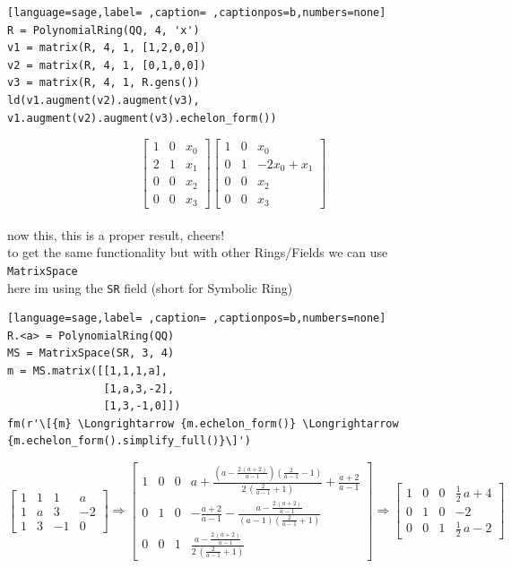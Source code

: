 \documentclass[a4paper,12pt]{article}
\begin{document}
\begin{lstlisting}[language=sage,label= ,caption= ,captionpos=b,numbers=none]
R = PolynomialRing(QQ, 4, 'x')
v1 = matrix(R, 4, 1, [1,2,0,0])
v2 = matrix(R, 4, 1, [0,1,0,0])
v3 = matrix(R, 4, 1, R.gens())
ld(v1.augment(v2).augment(v3), v1.augment(v2).augment(v3).echelon_form())
\end{lstlisting}

\[\left[\begin{array}{rrr} 1 & 0 & x_{0} \\ 2 & 1 & x_{1} \\ 0 & 0 & x_{2} \\ 0 & 0 & x_{3} \end{array}\right] \left[\begin{array}{rrr} 1 & 0 & x_{0} \\ 0 & 1 & -2 x_{0} + x_{1} \\ 0 & 0 & x_{2} \\ 0 & 0 & x_{3} \end{array}\right]\]\\[0pt]

now this, this is a proper result, cheers!\\[0pt]
to get the same functionality but with other Rings/Fields we can use \texttt{MatrixSpace}\\[0pt]
here im using the \texttt{SR} field (short for Symbolic Ring)\\[0pt]

\begin{lstlisting}[language=sage,label= ,caption= ,captionpos=b,numbers=none]
R.<a> = PolynomialRing(QQ)
MS = MatrixSpace(SR, 3, 4)
m = MS.matrix([[1,1,1,a],
               [1,a,3,-2],
               [1,3,-1,0]])
fm(r'\[{m} \Longrightarrow {m.echelon_form()} \Longrightarrow {m.echelon_form().simplify_full()}\]')
\end{lstlisting}

\[\left[\begin{array}{rrrr} 1 & 1 & 1 & a \\ 1 & a & 3 & -2 \\ 1 & 3 & -1 & 0 \end{array}\right] \Longrightarrow \left[\begin{array}{rrrr} 1 & 0 & 0 & a + \frac{{\left(a - \frac{2 \, {\left(a + 2\right)}}{a - 1}\right)} {\left(\frac{2}{a - 1} - 1\right)}}{2 \, {\left(\frac{2}{a - 1} + 1\right)}} + \frac{a + 2}{a - 1} \\ 0 & 1 & 0 & -\frac{a + 2}{a - 1} - \frac{a - \frac{2 \, {\left(a + 2\right)}}{a - 1}}{{\left(a - 1\right)} {\left(\frac{2}{a - 1} + 1\right)}} \\ 0 & 0 & 1 & \frac{a - \frac{2 \, {\left(a + 2\right)}}{a - 1}}{2 \, {\left(\frac{2}{a - 1} + 1\right)}} \end{array}\right] \Longrightarrow \left[\begin{array}{rrrr} 1 & 0 & 0 & \frac{1}{2} \, a + 4 \\ 0 & 1 & 0 & -2 \\ 0 & 0 & 1 & \frac{1}{2} \, a - 2 \end{array}\right]\]\\[0pt]
\end{document}
